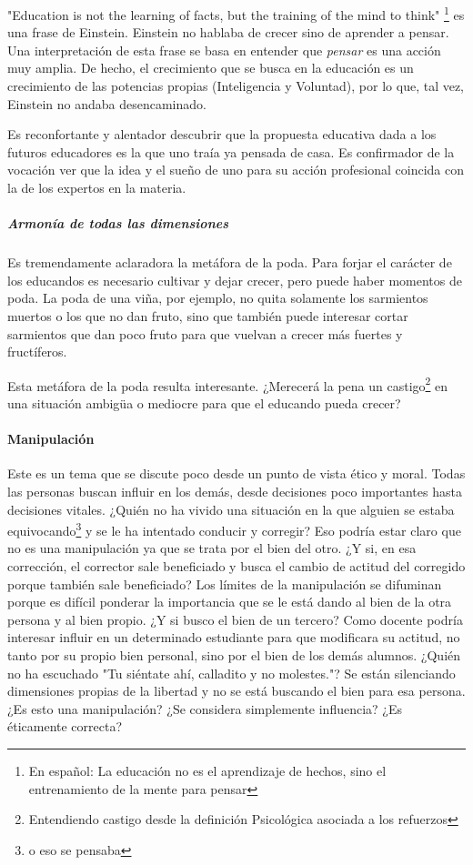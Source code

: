 "Education is not the learning of facts, but the training of the mind to think" \footnote{En español: La educación no es el aprendizaje de hechos, sino el entrenamiento de la mente para pensar} es una frase de Einstein.
%
Einstein no hablaba de crecer sino de aprender a pensar. 
%
Una interpretación de esta frase se basa en entender que \textit{pensar} es una acción muy amplia. 
%
De hecho, el crecimiento que se busca en la educación es un crecimiento de las potencias propias (Inteligencia y Voluntad), por lo que, tal vez, Einstein no andaba desencaminado.

Es reconfortante y alentador descubrir que la propuesta educativa dada a los futuros educadores es la que uno traía ya pensada de casa.
%
Es confirmador de la vocación ver que la idea y el sueño de uno para su acción profesional coincida con la de los expertos en la materia.


\subparagraph{Armonía de todas las dimensiones} 
%
Es tremendamente aclaradora la metáfora de la poda.
%
Para forjar el carácter de los educandos es necesario cultivar y dejar crecer, pero puede haber momentos de poda.
%
La poda de una viña, por ejemplo, no quita solamente los sarmientos muertos o los que no dan fruto, sino que también puede interesar cortar sarmientos que dan poco fruto para que vuelvan a crecer más fuertes y fructíferos.

Esta metáfora de la poda resulta interesante. 
%
¿Merecerá la pena un castigo\footnote{Entendiendo castigo desde la definición Psicológica asociada a los refuerzos} en una situación ambigüa o mediocre para que el educando pueda crecer?



\paragraph{Manipulación} 
%
Este es un tema que se discute poco desde un punto de vista ético y moral.
%
Todas las personas buscan influir en los demás, desde decisiones poco importantes hasta decisiones vitales.
%
¿Quién no ha vivido una situación en la que alguien se estaba equivocando\footnote{o eso se pensaba} y se le ha intentado conducir y corregir? 
%
Eso podría estar claro que no es una manipulación ya que se trata por el bien del otro.
%
¿Y si, en esa corrección, el corrector sale beneficiado y busca el cambio de actitud del corregido porque también sale beneficiado?
%
Los límites de la manipulación se difuminan porque es difícil ponderar la importancia que se le está dando al bien de la otra persona y al bien propio.
%
¿Y si busco el bien de un tercero?
%
Como docente podría interesar influir en un determinado estudiante para que modificara su actitud, no tanto por su propio bien personal, sino por el bien de los demás alumnos.
%
¿Quién no ha escuchado "Tu siéntate ahí, calladito y no molestes."?
%
Se están silenciando dimensiones propias de la libertad y no se está buscando el bien para esa persona.
%
¿Es esto una manipulación? ¿Se considera simplemente influencia? ¿Es éticamente correcta?

